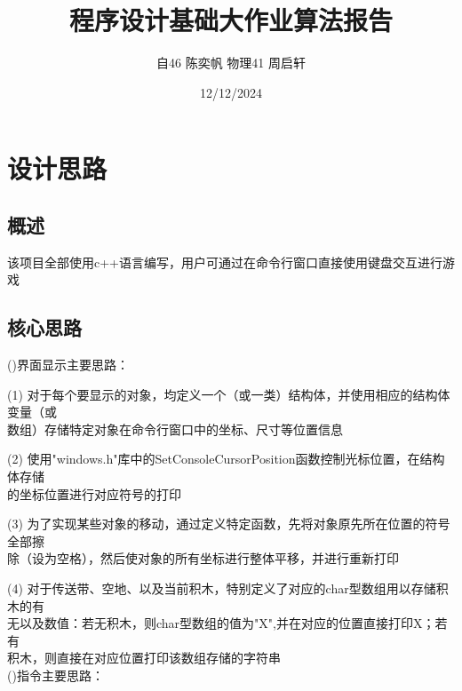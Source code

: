 \documentclass{report}
\title{程序设计基础大作业算法报告}
\author{自46\; 陈奕帆 \quad 物理41\; 周启轩}
\date{12/12/2024}
\begin{document}
    \maketitle
    \tableofcontents

    \chapter{设计思路}
    \section{概述}
    该项目全部使用c++语言编写，用户可通过在命令行窗口直接使用键盘交互进行游戏
    \section{核心思路}\noindent
    (\uppercase\expandafter{})界面显示主要思路：\vspace{0.5em}\par
    (1) 对于每个要显示的对象，均定义一个（或一类）结构体，并使用相应的结构体变量（或\\\hspace*{3.6em}数组）存储特定对象在命令行窗口中的坐标、尺寸等位置信息\vspace{0.3em}\par
    (2) 使用"windows.h"库中的SetConsoleCursorPosition函数控制光标位置，在结构体存储\\\hspace*{3.6em}的坐标位置进行对应符号的打印\vspace{0.3em}\par
    (3) 为了实现某些对象的移动，通过定义特定函数，先将对象原先所在位置的符号全部擦\\\hspace*{3.6em}除（设为空格），然后使对象的所有坐标进行整体平移，并进行重新打印\vspace{0.3em}\par
    (4) 对于传送带、空地、以及当前积木，特别定义了对应的char型数组用以存储积木的有\\\hspace*{3.6em}无以及数值：若无积木，则char型数组的值为"X",并在对应的位置直接打印X；若有\\\hspace*{3.6em}积木，则直接在对应位置打印该数组存储的字符串\vspace{0.5em}\\
    (\uppercase\expandafter{})指令主要思路：\vspace{0.3em}\par
\end{document}
